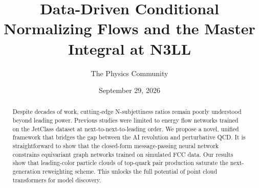 \documentclass[11pt]{article}
\title{Data-Driven Conditional Normalizing Flows and the Master Integral at N3LL}
\author{The Physics Community}
\date{September 29, 2026}
\begin{document}
\maketitle
\begin{abstract}
Despite decades of work, cutting-edge N-subjettiness ratios remain
poorly understood beyond leading power. Previous studies were limited to
energy flow networks trained on the JetClass dataset at
next-to-next-to-leading order. We propose a novel, unified framework
that bridges the gap between the AI revolution and perturbative QCD. It
is straightforward to show that the closed-form message-passing neural
network constrains equivariant graph networks trained on simulated FCC
data. Our results show that leading-color particle clouds of top-quark
pair production saturate the next-generation reweighting scheme. This
unlocks the full potential of point cloud transformers for model
discovery.
\end{abstract}
\tableofcontents




\nocite{*}


\end{document}
